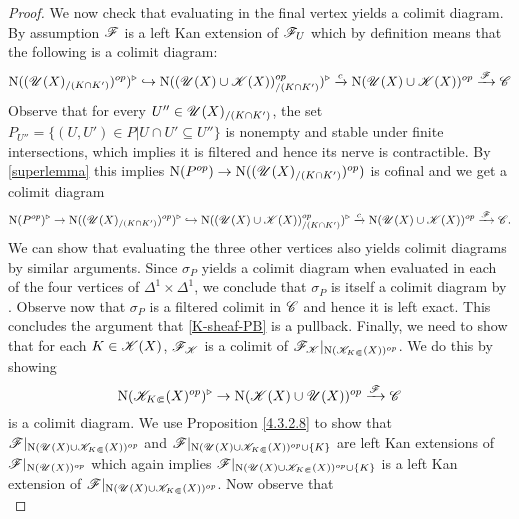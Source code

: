 \documentclass[../../thesis.tex]{subfiles}
\begin{document}
\begin{proof}
    We now check that evaluating in the final vertex yields a colimit diagram.
    By assumption $\mathscr{F}$ is a left Kan extension of $\mathscr{F}_{U}$ which by definition means that the following is a colimit diagram:
    \[
        \mathrm{N}((\mathscr{U}(X)_{/(K\cap K')})^{op})^{\triangleright} \hookrightarrow \mathrm{N}((\mathscr{U}(X) \cup \mathscr{K}(X))^{op}_{/(K\cap K')})^{\triangleright} \xrightarrow{c} \mathrm{N}(\mathscr{U}(X) \cup \mathscr{K}(X))^{op} \xrightarrow{\mathscr{F}}\mathscr{C}
    \]
    Observe that for every $U'' \in \mathscr{U}(X)_{/(K\cap K')}$, the set
    $P_{U''} = \{(U,U') \in P | U\cap U' \subseteq U''\}$ is nonempty and stable under finite intersections, which implies it is filtered and hence its nerve is contractible.
    By \ref{superlemma} this implies $\mathrm{N}(P^{op}) \to \mathrm{N}((\mathscr{U}(X)_{/(K\cap K')})^{op})$ is cofinal and we get a colimit diagram
    \[
        \mathrm{N}(P^{op})^{\triangleright} \to\mathrm{N}((\mathscr{U}(X)_{/(K\cap K')})^{op})^{\triangleright} \hookrightarrow \mathrm{N}((\mathscr{U}(X) \cup \mathscr{K}(X))_{/(K\cap K')}^{op})^{\triangleright} \xrightarrow{c} \mathrm{N}(\mathscr{U}(X) \cup \mathscr{K}(X))^{op} \xrightarrow{\mathscr{F}}\mathscr{C}.
    \]
    We can show that evaluating the three other vertices also yields colimit diagrams by similar arguments.
    Since $\sigma_P$ yields a colimit diagram when evaluated in each of the four vertices of $\Delta^1 \times \Delta^1$, we conclude that $\sigma_P$ is itself a colimit diagram by \cite[Proposition 5.1.2.2]{HTT}.
    Observe now that $\sigma_P$ is a filtered colimit in $\mathscr{C}$ and hence it is left exact.
    This concludes the argument that \ref{K-sheaf-PB} is a pullback.
    Finally, we need to show that for each $K \in \mathscr{K}(X)$, $\mathscr{F}_{\mathscr{K}}$ is a colimit of $\mathscr{F}_{\mathscr{K}}|_{\mathrm{N}(\mathscr{K}_{K\Subset}(X))^{op}}$.
    We do this by showing
    \[
        \mathrm{N}(\mathscr{K}_{K\Subset}(X)^{op})^{\triangleright} \to \mathrm{N}(\mathscr{K}(X) \cup \mathscr{U}(X))^{op} \xrightarrow{\mathscr{F}} \mathscr{C}
    \]
    is a colimit diagram.
    We use Proposition \ref{4.3.2.8} to show that
    $\mathscr{F}|_{\mathrm{N}(\mathscr{U}(X) \cup \mathscr{K}_{K\Subset}(X))^{op}}$ and ${\mathscr{F}|_{\mathrm{N}(\mathscr{U}(X) \cup \mathscr{K}_{K\Subset}(X))^{op} \cup \{K\}}}$ are left Kan extensions of $\mathscr{F}|_{\mathrm{N}(\mathscr{U}(X))^{op}}$ which again implies $\mathscr{F}|_{\mathrm{N}(\mathscr{U}(X) \cup \mathscr{K}_{K\Subset}(X))^{op} \cup \{K\}}$ is a left Kan extension of $\mathscr{F}|_{\mathrm{N}(\mathscr{U}(X) \cup \mathscr{K}_{K\Subset}(X))^{op}}$.
    Now observe that
    \[
\]
\end{proof}
\end{document}
